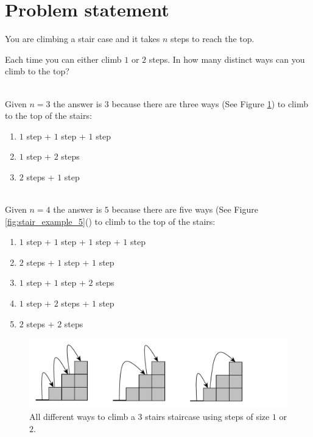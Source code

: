 \section{Problem statement}
\label{sec:stairs_climbing_statement_easy}
\begin{exercise}
You are climbing a stair case and it takes $n$ steps to reach the top.

Each time you can either climb $1$ or $2$ steps. In how many distinct ways can you climb to the top?


\begin{example}
	\hfill \\ 
	Given $n = 3$ the answer is $3$ because there are three ways (See Figure \ref{fig:stair_example_3}) to climb to the top of the stairs:
	\begin{enumerate}
		\item $1$ step + $1$ step + $1$ step
		\item $1$ step + $2$ steps
		\item $2$ steps + $1$ step
	\end{enumerate}
	

	
\end{example}

\begin{example}
	\hfill \\
	Given $n = 4$ the answer is $5$ because there are five ways (See Figure \ref{fig:stair_example_5}() to climb to the top of the stairs:
	\begin{enumerate}
		\item $1$ step + $1$ step + $1$ step + $1$ step
		\item $2$ steps + $1$ step + $1$ step
		\item $1$ step + $1$ step + $2$ steps 
		\item $1$ step + $2$ steps + $1$ step
		\item $2$ steps +  $2$ steps
	\end{enumerate}
	
	
\end{example}
\end{exercise}

\begin{figure}
	\centering
	\includegraphics[width=\textwidth]{sources/stairs_climbing/images/stairs3}
	\caption{All different ways to climb a 3 stairs staircase using steps of size $1$ or $2$.}
	\label{fig:stair_example_3}
\end{figure}


